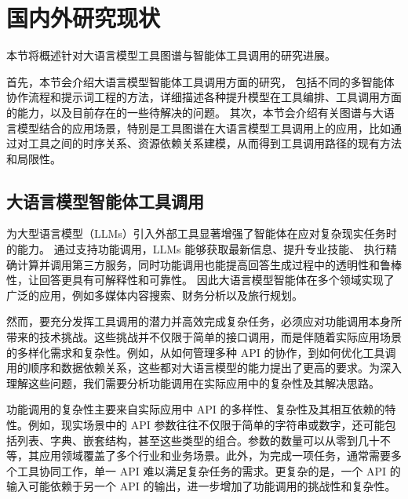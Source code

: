 \section{国内外研究现状}

本节将概述针对大语言模型工具图谱与智能体工具调用的研究进展。


首先，本节会介绍大语言模型智能体工具调用方面的研究，
包括不同的多智能体协作流程和提示词工程的方法，详细描述各种提升模型在工具编排、工具调用方面的能力，以及目前存在的一些待解决的问题。
其次，本节会介绍有关图谱与大语言模型结合的应用场景，特别是工具图谱在大语言模型工具调用上的应用，比如通过对工具之间的时序关系、资源依赖关系建模，从而得到工具调用路径的现有方法和局限性。

\subsection{大语言模型智能体工具调用}

为大型语言模型（LLMs）引入外部工具显著增强了智能体在应对复杂现实任务时的能力\cite{huang2024planning, Qin2023, qu2024tool}。
通过支持功能调用，LLMs 能够获取最新信息、提升专业技能、
执行精确计算并调用第三方服务，同时功能调用也能提高回答生成过程中的透明性和鲁棒性，让回答更具有可解释性和可靠性。
因此大语言模型智能体在多个领域实现了广泛的应用，例如多媒体内容搜索\cite{Song2023}、财务分析\cite{theuma2024equipping}以及旅行规划\cite{hao2024large}。

然而，要充分发挥工具调用的潜力并高效完成复杂任务，必须应对功能调用本身所带来的技术挑战。这些挑战并不仅限于简单的接口调用，而是伴随着实际应用场景的多样化需求和复杂性。例如，从如何管理多种 API 的协作，到如何优化工具调用的顺序和数据依赖关系，这些都对大语言模型的能力提出了更高的要求\cite{huang2024planning, Qin2023}。为深入理解这些问题，我们需要分析功能调用在实际应用中的复杂性及其解决思路。

功能调用的复杂性主要来自实际应用中 API 的多样性、复杂性及其相互依赖的特性\cite{Qin2023}。例如，现实场景中的 API 参数往往不仅限于简单的字符串或数字，还可能包括列表、字典、嵌套结构，甚至这些类型的组合。参数的数量可以从零到几十不等，其应用领域覆盖了多个行业和业务场景\cite{ye2024tooleyes}。此外，为完成一项任务，通常需要多个工具协同工作，单一 API 难以满足复杂任务的需求\cite{huang2024planning}。更复杂的是，一个 API 的输入可能依赖于另一个 API 的输出\cite{Qin2023}，进一步增加了功能调用的挑战性和复杂性。

